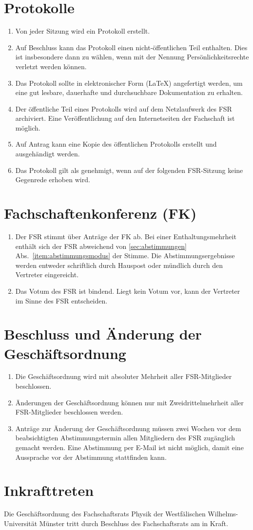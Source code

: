 \section{Protokolle}
\label{sec:protokolle}
\begin{enumerate}
	\item Von jeder Sitzung wird ein Protokoll erstellt.
	\item Auf Beschluss kann das Protokoll einen nicht-öffentlichen Teil enthalten.
	Dies ist insbesondere dann zu wählen, wenn mit der Nennung Persönlichkeitsrechte verletzt werden können.
	\item Das Protokoll sollte in elektronischer Form (\LaTeX) angefertigt werden, um eine gut lesbare, dauerhafte und durchsuchbare Dokumentation zu erhalten.
	\item Der öffentliche Teil eines Protokolls wird auf dem Netzlaufwerk des FSR archiviert.
	Eine Veröffentlichung auf den Internetseiten der Fachschaft ist möglich.
	\item Auf Antrag kann eine Kopie des öffentlichen Protokolls erstellt und ausgehändigt werden.
	\item Das Protokoll gilt als genehmigt, wenn auf der folgenden FSR-Sitzung keine Gegenrede erhoben wird.
\end{enumerate}

\section{Fachschaftenkonferenz (FK)}
\begin{enumerate}
	\item Der FSR stimmt über Anträge der FK ab.
	Bei einer Enthaltungsmehrheit enthält sich der FSR abweichend von \ref{sec:abstimmungen} Abs.~\ref{item:abstimmungsmodus} der Stimme.
	Die Abstimmungsergebnisse werden entweder schriftlich durch Hauspost oder mündlich durch den Vertreter eingereicht.
	\item Das Votum des FSR ist bindend.
	Liegt kein Votum vor, kann der Vertreter im Sinne des FSR entscheiden.
\end{enumerate}

\section{Beschluss und Änderung der Geschäftsordnung}
\begin{enumerate}
	\item Die Geschäftsordnung wird mit absoluter Mehrheit aller FSR-Mitglieder beschlossen.
	\item Änderungen der Geschäftsordnung können nur mit Zweidrittelmehrheit aller FSR-Mitglieder beschlossen werden.
	\item Anträge zur Änderung der Geschäftsordnung müssen zwei Wochen vor dem beabsichtigten Abstimmungstermin allen Mitgliedern des FSR zugänglich gemacht werden.
	Eine Abstimmung per E-Mail ist nicht möglich, damit eine Aussprache vor der Abstimmung stattfinden kann.
\end{enumerate}

\section{Inkrafttreten}
Die Geschäftsordnung des Fachschaftsrats Physik der Westfälischen Wilhelms-Universität Münster tritt durch Beschluss des Fachschaftsrats am  in Kraft.


